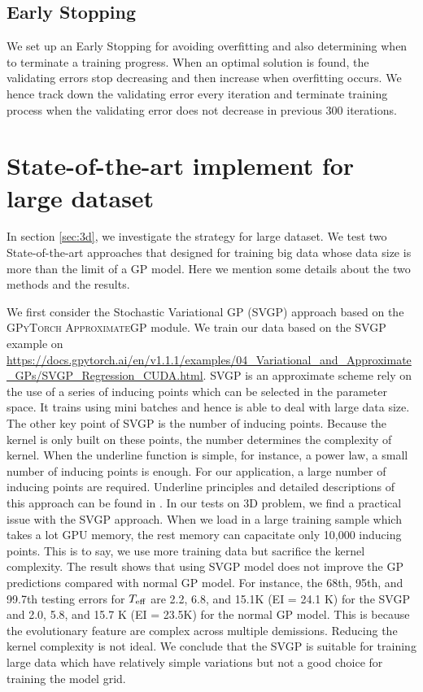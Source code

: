 \subsection{Early Stopping}

We set up an Early Stopping for avoiding overfitting and also determining when to terminate a training progress. 
When an optimal solution is found, the validating errors stop decreasing and then increase when overfitting occurs. 
We hence track down the validating error every iteration and terminate training process when the validating error does not decrease in previous 300 iterations. 	

\section{State-of-the-art implement for large dataset}\label{app:B}

In section \ref{sec:3d}, we investigate the strategy for large dataset. We test two State-of-the-art approaches that designed for training big data whose data size is more than the limit of a GP model. Here we mention some details about the two methods and the results. 

We first consider the Stochastic Variational GP (SVGP) approach based on the \textsc{GPyTorch ApproximateGP} module. 
We train our data based on the SVGP example on \url{https://docs.gpytorch.ai/en/v1.1.1/examples/04_Variational_and_Approximate_GPs/SVGP_Regression_CUDA.html}. 
SVGP is an approximate scheme rely on the use of a series of inducing points which can be selected in the parameter space. It trains using mini batches and hence is able to deal with large data size. The other key point of SVGP is the number of inducing points. Because the kernel is only built on these points, the number determines the complexity of kernel. When the underline function is simple, for instance, a power law, a small number of inducing points  is enough. For our application, a large number of inducing points are required. Underline principles and detailed descriptions of this approach can be found in \citet{hensman2015scalable}. In our tests on 3D problem, we find a practical issue with the SVGP approach. When we load in a large training sample which takes a lot GPU memory, the rest memory can capacitate only 10,000 inducing points. This is to say, we use more training data but sacrifice the kernel complexity.  The result shows that using SVGP model does not improve the GP predictions compared with normal GP model. For instance, the 68th, 95th, and 99.7th testing errors for $T_{\rm eff}$ are 2.2, 6.8, and 15.1K (EI = 24.1 K) for the SVGP and 2.0, 5.8, and 15.7 K (EI = 23.5K) for the normal GP model. This is because the evolutionary feature are complex across multiple demissions. Reducing the kernel complexity is not ideal. We conclude that the SVGP is suitable for training large data which have relatively simple variations but not a good choice for training the model grid.  

